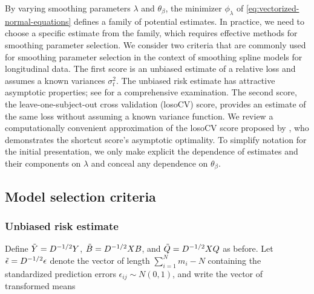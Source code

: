 \documentclass[../chapter-2-spline-representation.tex]{subfiles}
\begin{document}

\bigskip

By varying smoothing parameters $\lambda$ and $\theta_\beta$, the minimizer $\phi_\lambda$ of \ref{eq:vectorized-normal-equations} defines a family of potential estimates. In practice, we need to choose a specific estimate from the family, which requires effective methods for smoothing parameter selection. We consider two criteria that are commonly used for smoothing parameter selection in the context of smoothing spline models for longitudinal data. The first score is an unbiased estimate of a relative loss and assumes a known variances $\sigma_t^2$. The unbiased risk estimate has attractive asymptotic properties; see \citet{gu2013smoothing} for a comprehensive examination. The second score, the leave-one-subject-out cross validation (losoCV) score, provides an estimate of the same loss without assuming a known variance function. We review a computationally convenient approximation of the losoCV score proposed by \citet{xu2012asymptotic}, who demonstrates the shortcut score's asymptotic optimality. To simplify notation for the initial presentation, we only make explicit the dependence of estimates and their components on $\lambda$ and conceal any dependence on $\theta_\beta$. 

\subsection{Model selection criteria}
\subsubsection{Unbiased risk estimate}

Define  $\tilde{Y} = D^{-1/2} Y$, $\tilde{B} = D^{-1/2} X B $, and $\tilde{Q} = D^{-1/2} X Q$ as before. Let $\tilde{\epsilon} = D^{-1/2} \epsilon$ denote the vector of length  $\sum_{i = 1}^Nm_i - N$ containing the standardized prediction errors $\epsilon_{ij} \sim N\left(0,1\right)$, and write the vector of transformed means 
\end{document}
